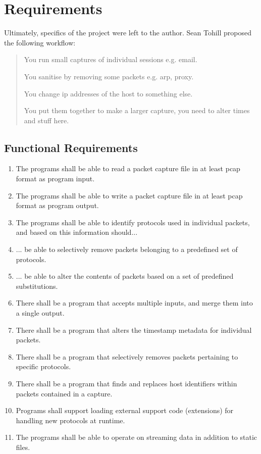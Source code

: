 \documentclass[10pt,a4paper,notitlepage]{report}
\begin{document}
\chapter{Requirements}
Ultimately, specifics of the project were left to the author. Sean Tohill proposed the following workflow:

\begin{quote}
You run small captures of individual sessions e.g. email.

You sanitise by removing some packets e.g. arp, proxy.

You change ip addresses of the host to something else.

You put them together to make a larger capture, you need to alter times and stuff here.

\end{quote}

\section{Functional Requirements}

\begin{enumerate}[label=\bfseries FR\arabic*:]
\item \label{fr:1} The programs shall be able to read a packet capture file in at least pcap format as program input.
\item \label{fr:2} The programs shall be able to write a packet capture file in at least pcap format as program output.
\item \label{fr:3} The programs shall be able to identify protocols used in individual packets, and based on this information should...
\item \label{fr:4} ... be able to selectively remove packets belonging to a predefined set of protocols.
\item \label{fr:5} ... be able to alter the contents of packets based on a set of predefined substitutions.
\item \label{fr:6} There shall be a program that accepts multiple inputs, and merge them into a single output.
\item \label{fr:7} There shall be a program that alters the timestamp metadata for individual packets.
\item \label{fr:8} There shall be a program that selectively removes packets pertaining to specific protocols.
\item \label{fr:9} There shall be a program that finds and replaces host identifiers within packets contained in a capture.
\item \label{fr:10} Programs shall support loading external support code (extensions) for handling new protocols at runtime.
\item \label{fr:11} The programs shall be able to operate on streaming data in addition to static files.
\end{enumerate}
\end{document}
